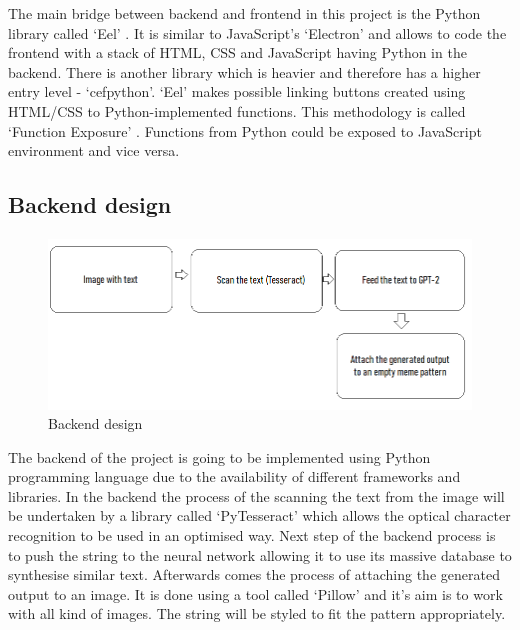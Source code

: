 \documentclass[12pt]{report}
\begin{document}
    The main bridge between backend and frontend in this project is the Python library called `Eel' \citep{eel_github}. It is similar to JavaScript's `Electron' and allows to code the frontend with a stack of HTML, CSS and JavaScript having Python in the backend. There is another library which is heavier and therefore has a higher entry level - `cefpython'.
    `Eel' makes possible linking buttons created using HTML/CSS to Python-implemented functions. This methodology is called `Function Exposure' \citep{eel_github}. Functions from Python could be exposed to JavaScript environment and vice versa.

    \clearpage

    \subsection*{Backend design}
    \paragraph{}

    \begin{figure}[htbp]
        \centerline{\includegraphics[scale=.5]{img/backend_diagram.png}}
        \label{backend_diagram}
        \caption{Backend design}
    \end{figure}

    The backend of the project is going to be implemented using Python programming language due to the availability of different frameworks and libraries. In the backend the process of the scanning the text from the image will be undertaken by a library called `PyTesseract' which allows the optical character recognition to be used in an optimised way.
    Next step of the backend process is to push the string to the neural network allowing it to use its massive database to synthesise similar text. Afterwards comes the process of attaching the generated output to an image. It is done using a tool called `Pillow' and it's aim is to work with all kind of images. The string will be styled to fit the pattern appropriately.
\end{document}
